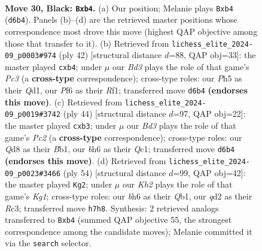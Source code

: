 \documentclass[11pt]{article}
\begin{document}
\clearpage

\begin{figure}[p]\centering
\begin{subfigure}{0.46\textwidth}\centering
\resizebox{\linewidth}{!}{%
\newchessgame
\chessboard[
  setfen={r2qr3/ppp4k/3b1ppB/3b3p/PR6/2N3P1/RPPQ1P1P/6K1 b - - 3 30},
  showmover=false,
  pgfstyle=straightmove, color=movearrow, markmove={d6-b4}
]}
\caption{}
\end{subfigure}\hfill
\begin{subfigure}{0.46\textwidth}\centering
\resizebox{\linewidth}{!}{%
\newchessgame
\chessboard[
  setfen={1r5r/p3npkp/6p1/1p1Bp1q1/1b2P3/2P5/P4PPP/R2Q1R1K w - - 0 22},
  showmover=false,
  pgfstyle=straightmove, color=movearrow, markmove={c3-b4}
]}
\caption{}
\end{subfigure}
\\[4pt]
\begin{subfigure}{0.46\textwidth}\centering
\resizebox{\linewidth}{!}{%
\newchessgame
\chessboard[
  setfen={r3rnk1/1pq2pp1/2p5/p1P2n1p/P7/1b3P2/2P2BPP/RBQ1R2K w - - 0 23},
  showmover=false,
  pgfstyle=straightmove, color=movearrow, markmove={c2-b3}
]}
\caption{}
\end{subfigure}\hfill
\begin{subfigure}{0.46\textwidth}\centering
\resizebox{\linewidth}{!}{%
\newchessgame
\chessboard[
  setfen={r5k1/1p1rqp1p/2b1p1p1/nN6/P3B3/2R3P1/1R3P1P/1Q4K1 w - - 2 28},
  showmover=false,
  pgfstyle=straightmove, color=movearrow, markmove={g1-g2}
]}
\caption{}
\end{subfigure}
\caption{\textbf{Move 30, Black: \texttt{Bxb4}.} (a) Our position; Melanie plays \texttt{Bxb4} (\texttt{d6b4}). Panels (b)--(d) are the retrieved master positions whose correspondence most drove this move (highest QAP objective among those that transfer to it). (b) Retrieved from \texttt{lichess\_elite\_2024-09\_p0003\#974} (ply 42) [structural distance $d$=88, QAP obj=33]: the master played \texttt{cxb4}; under $\mu$ our \emph{Bd3} plays the role of that game's \emph{Pc3} (a \textbf{cross-type} correspondence); cross-type roles: our \emph{P}h5 as their \emph{Q}d1, our \emph{P}f6 as their \emph{R}f1; transferred move \texttt{d6b4} \textbf{(endorses this move)}. (c) Retrieved from \texttt{lichess\_elite\_2024-09\_p0019\#3742} (ply 44) [structural distance $d$=97, QAP obj=22]: the master played \texttt{cxb3}; under $\mu$ our \emph{Bd3} plays the role of that game's \emph{Pc2} (a \textbf{cross-type} correspondence); cross-type roles: our \emph{Q}d8 as their \emph{B}b1, our \emph{b}h6 as their \emph{Q}c1; transferred move \texttt{d6b4} \textbf{(endorses this move)}. (d) Retrieved from \texttt{lichess\_elite\_2024-09\_p0023\#3466} (ply 54) [structural distance $d$=99, QAP obj=42]: the master played \texttt{Kg2}; under $\mu$ our \emph{Kh2} plays the role of that game's \emph{Kg1}; cross-type roles: our \emph{b}h6 as their \emph{Q}b1, our \emph{q}d2 as their \emph{R}c3; transferred move \texttt{h7h8}. Synthesis: 2 retrieved analogs transferred to \texttt{Bxb4} (summed QAP objective 55, the strongest correspondence among the candidate moves); Melanie committed it via the \texttt{search} selector.}
\label{fig:thought-m59}
\end{figure}
\end{document}
